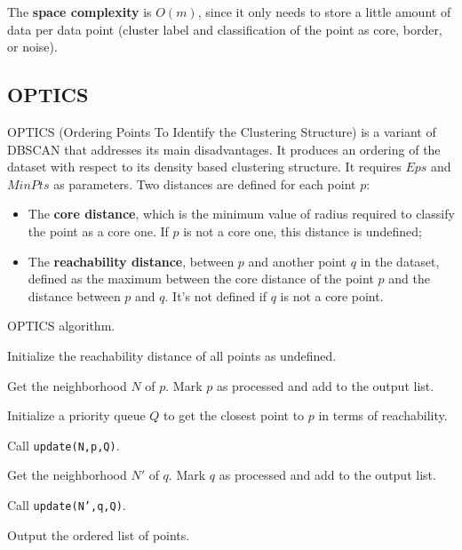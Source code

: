 The \textbf{space complexity} is $O(m)$, since it only needs to store a little amount of data per data point (cluster label and classification of the point as core, border, or noise).

\subsection{OPTICS}

OPTICS (Ordering Points To Identify the Clustering Structure) is a variant of DBSCAN that addresses its main disadvantages. It produces an ordering of the dataset with respect to its density based clustering structure. It requires $Eps$ and $MinPts$ as parameters. Two distances are defined for each point $p$:
\begin{itemize}
    \item The \textbf{core distance}, which is the minimum value of radius required to classify the point as a core one. If $p$ is not a core one, this distance is undefined;

    \item The \textbf{reachability distance}, between $p$ and another point $q$ in the dataset, defined as the maximum between the core distance of the point $p$ and the distance between $p$ and $q$. It's not defined if $q$ is not a core point.
\end{itemize}

\begin{algorithm}
\caption{OPTICS algorithm.}
\begin{algorithmic}[1]
    \State Initialize the reachability distance of all points as undefined.

        \State Get the neighborhood $N$ of $p$.
        \State Mark $p$ as processed and add to the output list.

            \State Initialize a priority queue $Q$ to get the closest point to $p$ in terms of reachability.

            \State Call \texttt{update(N,p,Q)}.

                \State Get the neighborhood $N'$ of $q$.
                \State Mark $q$ as processed and add to the output list.

                    \State Call \texttt{update(N',q,Q)}.
                \EndIf
            \EndFor
        \EndIf
    \EndFor

    \State Output the ordered list of points.
\end{algorithmic}
\end{algorithm}

